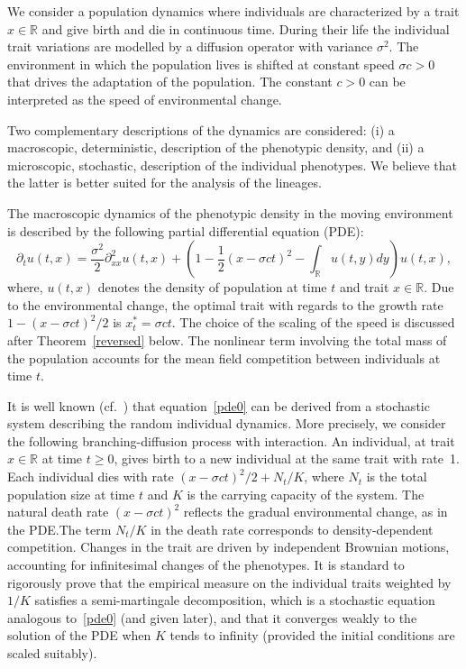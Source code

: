 \documentclass[10pt]{amsart}
\theoremstyle{definition}\newtheorem{defi}[theo]{Definition}\newtheorem{rema}[theo]{Remark}\newtheorem{exam}[theo]{Example}\newtheorem{exem}[theo]{Example}\newtheorem{nota}[theo]{Notation}
\newcommand*\R{\mathbb{R}}
\begin{document}
We consider a population dynamics where individuals are characterized by a trait $x\in \R$ and give birth and die in continuous time. During their life the individual trait variations are modelled by a diffusion operator with variance $\sigma^2$. The environment in which the population lives is shifted at constant speed $\sigma c>0$ that drives the adaptation of the population. The constant $c>0$ can be interpreted as the speed of environmental change.



Two complementary descriptions of the dynamics are considered: (i) a macroscopic, deterministic, description of the phenotypic density, and (ii) a microscopic, stochastic, description of the individual phenotypes. We believe that the latter is better suited for the analysis of the lineages.



The macroscopic dynamics of the phenotypic density in the moving environment is described by the following partial differential equation (PDE):
\begin{equation}\label{pde0}
\partial_{t}u(t,x)=\frac{\sigma^2}{2}\partial^2_{xx} u(t,x)+\left(1-\frac{1}{2}(x-\sigma ct)^2-\int_{\R}u(t,y)dy \right)u(t,x),
\end{equation}
where, $u(t,x)$ denotes the density of population at time $t$ and trait $x\in \R$. Due to the environmental change, the optimal trait with regards to the growth rate $1-(x-\sigma ct)^2/2$ is $x^*_t=\sigma c t$. The choice of the scaling of the speed is discussed after Theorem~\ref{reversed} below. The nonlinear term involving the total mass of the population accounts for the mean field competition between individuals at time $t$.


It is well known (cf.~\cite{champagnat_microscopic_2006,champagnatferrieremeleard_stochmodels,fourniermeleard}) that equation~\eqref{pde0} can be derived from a stochastic system describing the random individual dynamics. More precisely, we consider the following branching-diffusion process with interaction. An individual, at trait $x\in \R$ at time $t\geq 0$, gives birth to a new individual at the same trait with rate~1. Each individual dies with rate $(x-\sigma ct)^2/2+N_t/K$, where $N_t$ is the total population size at time $t$ and $K$ is the carrying capacity of the system. The natural death rate $(x-\sigma ct)^2$ reflects the gradual environmental change, as in the PDE.\linebreak The term $N_t/K$ in the death rate corresponds to density-dependent competition. Changes in the trait are driven by independent Brownian motions, accounting for infinitesimal changes of the phenotypes. It is standard to rigorously prove that the empirical measure on the individual traits weighted by $1/K$ satisfies a semi-martingale decomposition, which is a stochastic equation analogous to~\eqref{pde0} (and given later), and that it converges weakly to the solution of the PDE when $K$ tends to infinity (provided the initial conditions are scaled suitably).
\end{document}

